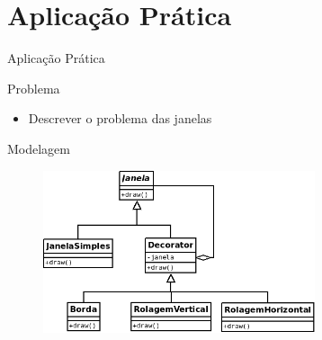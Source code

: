 \section{Aplicação Prática}

\begin{frame}{Aplicação Prática}{}
\begin{block}{Problema}
  \begin{itemize}
    \item<1-> Descrever o problema das janelas
  \end{itemize}
\end{block}
\end{frame}

\begin{frame}{Modelagem}
\begin{block}{}
  \begin{figure}
    \includegraphics[width=8cm]{figuras/decoratorUML}
  \end{figure}
\end{block}
\end{frame}

